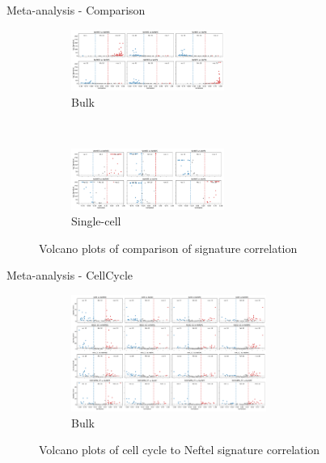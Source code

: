 \documentclass[aspectratio=169,9pt]{beamer}
\begin{document}
    \begin{frame}{Meta-analysis - Comparison}
        \begin{adjustwidth}{-5cm}{-5cm}
            \centering
            \begin{figure}\ContinuedFloat
                \centering
                \begin{subfigure}[c]{\textwidth}
                    \centering
                    \includegraphics[width=0.55\textwidth]{volcano_Bulk_2D}
                    \caption{Bulk}
                \end{subfigure}
                \\
                \begin{subfigure}[c]{\textwidth}
                    \centering
                    \includegraphics[width=0.55\textwidth]{volcano_SC_2D}
                    \caption{Single-cell}
                \end{subfigure}
                \caption{Volcano plots of comparison of signature correlation}
            \end{figure}
        \end{adjustwidth}
    \end{frame}

    \begin{frame}{Meta-analysis - CellCycle}
        \begin{adjustwidth}{-5cm}{-5cm}
            \centering
            \begin{figure}
                \centering
                \begin{subfigure}[c]{\textwidth}
                    \centering
                    \includegraphics[width=0.7\textwidth]{volcano_Bulk_Nef_CC}
                    \caption{Bulk}
                \end{subfigure}
                \caption{Volcano plots of cell cycle to Neftel signature correlation}
            \end{figure}
        \end{adjustwidth}
    \end{frame}
\end{document}
